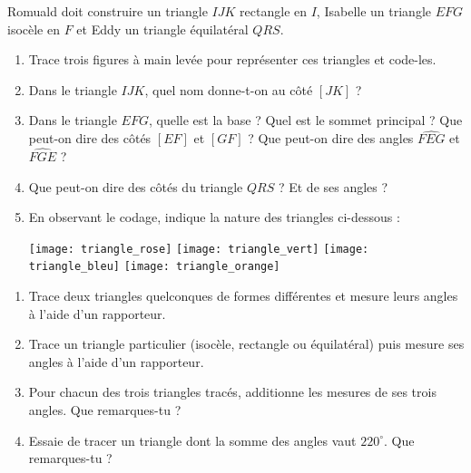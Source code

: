 \begin{activite}

Romuald doit construire un triangle $IJK$ rectangle en $I$, Isabelle un triangle $EFG$ isocèle en $F$ et Eddy un triangle équilatéral $QRS$.

\begin{enumerate}

\item Trace trois figures à main levée pour représenter ces triangles et code-les.

\vspace{4cm}
\item Dans le triangle $IJK$, quel nom donne-t-on au côté $[JK]$ ? \dotfill

\item Dans le triangle $EFG$, quelle est la base ? Quel est le sommet principal ? Que peut-on dire des côtés $[EF]$ et $[GF]$ ? Que peut-on dire des angles $\widehat{FEG}$ et $\widehat{FGE}$ ?  \dotfill

 \dotfill

\item Que peut-on dire des côtés du triangle $QRS$ ? Et de ses angles ?  \dotfill

\item En observant le codage, indique la nature des triangles ci-dessous :

\texttt{[image: triangle\_rose]} \hfill \texttt{[image: triangle\_vert]} \hfill \texttt{[image: triangle\_bleu]} \hfill \texttt{[image: triangle\_orange]}

\end{enumerate}

\end{activite}


\begin{activite}

\begin{enumerate}
\item Trace deux triangles quelconques de formes différentes et mesure leurs angles à l'aide d'un rapporteur.

\item Trace un triangle particulier (isocèle, rectangle ou équilatéral) puis mesure ses angles à l'aide d'un rapporteur.

\item Pour chacun des trois triangles tracés, additionne les mesures de ses trois angles. Que remarques-tu ?

\item Essaie de tracer un triangle dont la somme des angles vaut $220^\circ$. Que remarques-tu ?
\end{enumerate}

\end{activite}

